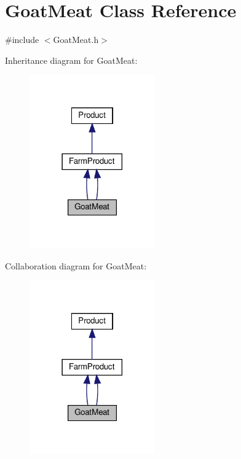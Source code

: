 \hypertarget{classGoatMeat}{}\section{Goat\+Meat Class Reference}
\label{classGoatMeat}


{\ttfamily \#include $<$Goat\+Meat.\+h$>$}



Inheritance diagram for Goat\+Meat\+:
\nopagebreak
\begin{figure}[H]
\begin{center}
\leavevmode
\includegraphics[width=153pt]{classGoatMeat__inherit__graph}
\end{center}
\end{figure}


Collaboration diagram for Goat\+Meat\+:
\nopagebreak
\begin{figure}[H]
\begin{center}
\leavevmode
\includegraphics[width=153pt]{classGoatMeat__coll__graph}
\end{center}
\end{figure}
